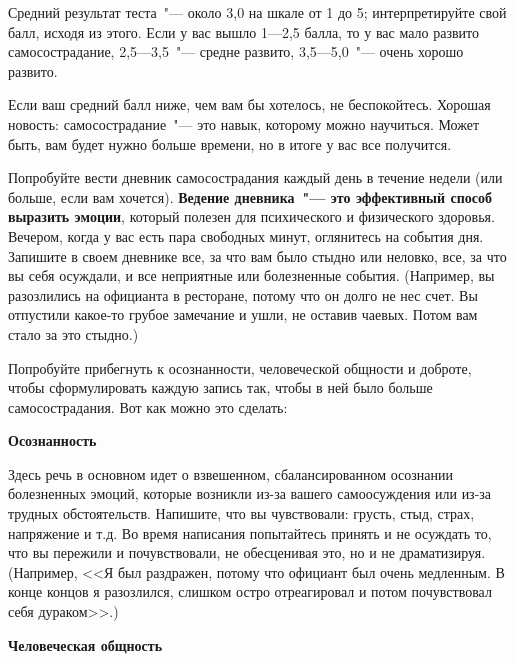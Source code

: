 \vspace{3ex}

Средний результат теста~"--- около 3,0 на шкале от 1 до 5; интерпретируйте свой балл, исходя из этого. 
Если у вас вышло 1---2,5 балла, то у вас мало развито самосострадание, 2,5---3,5~"--- средне развито, 3,5---5,0~"--- очень хорошо развито.

\newpage


\vspace{3ex}
Если ваш средний балл ниже, чем вам бы хотелось, не беспокойтесь. Хорошая новость: самосострадание~"--- это навык, которому можно научиться. Может быть, вам будет нужно больше времени, но в итоге у вас все получится. 



Попробуйте вести дневник самосострадания каждый день в течение недели (или больше, если вам хочется). \textbf{Ведение дневника~"--- это эффективный способ выразить эмоции}, который полезен для психического и физического здоровья.
Вечером, когда у вас есть пара свободных минут, оглянитесь на события дня. Запишите в своем дневнике все, за что вам было стыдно или неловко, все, за что вы себя осуждали, и все неприятные или болезненные события. (Например, вы разозлились на официанта в ресторане, потому что он долго не нес счет. Вы отпустили какое-то грубое замечание и ушли, не оставив чаевых. Потом вам стало за это стыдно.)

Попробуйте прибегнуть к осознанности, человеческой общности и доброте, чтобы сформулировать каждую запись так, чтобы в ней было больше самосострадания. Вот как можно это сделать:
\vspace{3ex}

\textbf{Осознанность}

Здесь речь в основном идет о взвешенном, сбалансированном осознании болезненных эмоций, которые возникли из-за вашего самоосуждения или из-за трудных обстоятельств. Напишите, что вы чувствовали: грусть, стыд, страх, напряжение и т.д. Во время написания попытайтесь принять и не осуждать то, что вы пережили и почувствовали, не обесценивая это, но и не драматизируя. (Например, <<Я был раздражен, потому что официант был очень медленным. В конце концов я разозлился, слишком остро отреагировал и потом почувствовал себя дураком>>.) 
\vspace{3ex}

\textbf{Человеческая общность}

